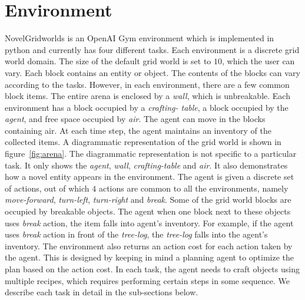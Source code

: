 \documentclass[sigconf]{aamas}
\begin{document}
\section{Environment}
\label{sec:environment}
NovelGridworlds is an OpenAI Gym environment which is implemented in python and currently has four different tasks.
Each environment is a discrete grid world domain. The size of the default grid world is set to $10$, which the user can vary. Each block contains an entity or object. The contents of the blocks can vary according to the tasks. However, in each environment, there are a few common block items. The entire arena is enclosed by a \emph{wall}, which is unbreakable. Each environment has a block occupied by a \emph{crafting- table}, a block occupied by the \emph{agent}, and free space occupied by \emph{air}. The agent can move in the blocks containing air. At each time step, the agent maintains an inventory of the collected items. A diagrammatic representation of the grid world is shown in figure~\ref{fig:arena}. The diagrammatic representation is not specific to a particular task. It only shows the \emph{agent}, \emph{wall}, \emph{crafting-table} and \emph{air}. It also demonstrates how a novel entity appears in the environment.  
The agent is given a discrete set of actions, out of which $4$ actions are common to all the environments, namely \emph{move-forward}, \emph{turn-left}, \emph{turn-right} and \emph{break}. Some of the grid world blocks are occupied by breakable objects. The agent when one block next to these objects uses \emph{break} action, the item falls into agent's inventory. For example, if the agent uses \emph{break} action in front of the \emph{tree-log}, the \emph{tree-log} falls into the agent's inventory.
The environment also returns an action cost for each action taken by the agent. This is designed by keeping in mind a planning agent to optimize the plan based on the action cost.
In each task, the agent needs to craft objects using multiple recipes, which requires performing certain steps in some sequence.
We describe each task in detail in the sub-sections below.
\end{document}
